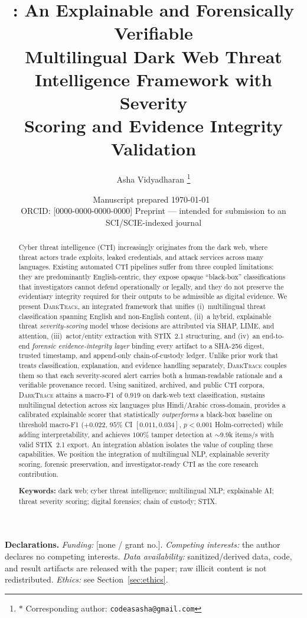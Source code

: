 \documentclass[11pt,a4paper]{article}
\title{\framework{}: An Explainable and Forensically Verifiable\\
Multilingual Dark Web Threat Intelligence Framework with Severity\\
Scoring and Evidence Integrity Validation}
\author[1,$\ast$]{Asha Vidyadharan%
  \thanks{$\ast$ Corresponding author: \texttt{codeasasha@gmail.com}}}
\affil[1]{\small [Department], [Institution], [City], [Country]}
\date{\small Manuscript prepared \today\ \\[2pt]
  \footnotesize ORCID: [0000-0000-0000-0000] \quad
  Preprint --- intended for submission to an SCI/SCIE-indexed journal}
\newcommand{\framework}{\textsc{DarkTrace}}
\begin{document}
\maketitle

\noindent\textbf{Declarations.}\quad
\textit{Funding:} [none / grant no.].\;
\textit{Competing interests:} the author declares no competing interests.\;
\textit{Data availability:} sanitized/derived data, code, and result artifacts are
released with the paper; raw illicit content is not redistributed.\;
\textit{Ethics:} see Section~\ref{sec:ethics}.

\vspace{0.4em}

\begin{abstract}
\noindent
Cyber threat intelligence (CTI) increasingly originates from the dark web, where
threat actors trade exploits, leaked credentials, and attack services across many
languages. Existing automated CTI pipelines suffer from three coupled limitations: they
are predominantly English-centric, they expose opaque ``black-box'' classifications that
investigators cannot defend operationally or legally, and they do not preserve the
evidentiary integrity required for their outputs to be admissible as digital evidence.
We present \framework{}, an integrated framework that unifies (i)~multilingual threat
classification spanning English and non-English content, (ii)~a hybrid, explainable
threat \emph{severity-scoring} model whose decisions are attributed via SHAP, LIME, and
attention, (iii)~actor/entity extraction with STIX~2.1 structuring, and (iv)~an
end-to-end \emph{forensic evidence-integrity layer} binding every artifact to a SHA-256
digest, trusted timestamp, and append-only chain-of-custody ledger. Unlike prior work
that treats classification, explanation, and evidence handling separately, \framework{}
couples them so that each severity-scored alert carries both a human-readable rationale
and a verifiable provenance record. Using sanitized, archived, and public CTI corpora,
\framework{} attains a macro-F1 of $0.919$ on dark-web text classification, sustains
multilingual detection across six languages plus Hindi/Arabic cross-domain, provides a
calibrated explainable scorer that statistically \emph{outperforms} a black-box baseline
on threshold macro-F1 ($+0.022$, $95\%$ CI $[0.011,0.034]$, $p<0.001$ Holm-corrected)
while adding interpretability, and achieves $100\%$ tamper detection at $\sim$9.9k items/s
with valid STIX~2.1 export. An integration ablation
isolates the value of coupling these capabilities. We position the integration of
multilingual NLP, explainable severity scoring, forensic preservation, and
investigator-ready CTI as the core research contribution.

\vspace{0.6em}
\noindent\textbf{Keywords:} dark web; cyber threat intelligence; multilingual NLP;
explainable AI; threat severity scoring; digital forensics; chain of custody; STIX.
\end{abstract}
\end{document}
